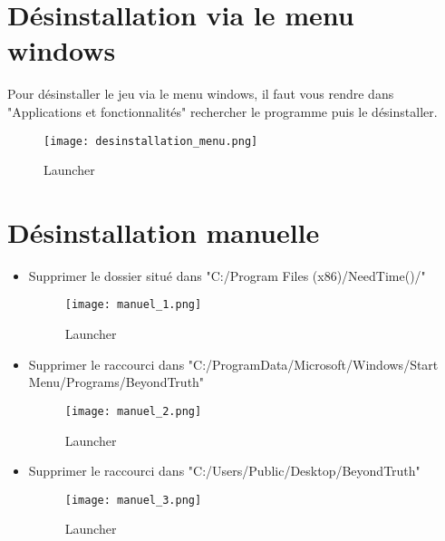 \documentclass[
	article,			%
	11pt,				%
	oneside,			%
	a4paper,			%
	chapter=TITLE,
	french,			%
	sumario=tradicional
	]{base_nt}
\begin{document}
\section{Désinstallation via le menu windows}

Pour désinstaller le jeu via le menu windows, il faut vous rendre dans "Applications et fonctionnalités" rechercher le programme puis le désinstaller.

\vspace{0cm}
\begin{figure}[ht]
	\caption{Launcher}
	\centering
	\texttt{[image: desinstallation\_menu.png]}
	
\end{figure}

\newpage

\section{Désinstallation manuelle}

\begin{itemize}
    \item Supprimer le dossier situé dans "C:/Program Files (x86)/NeedTime()/"
    \vspace{0cm}
    \begin{figure}[ht]
    	\caption{Launcher}
    	\centering
    	\texttt{[image: manuel\_1.png]}
    	
    \end{figure}
    \newpage
    \item Supprimer le raccourci dans "C:/ProgramData/Microsoft/Windows/Start Menu/Programs/BeyondTruth"
    \vspace{0cm}
    \begin{figure}[ht]
    	\caption{Launcher}
    	\centering
    	\texttt{[image: manuel\_2.png]}
    	
    \end{figure}
    \newpage
    \item Supprimer le raccourci dans "C:/Users/Public/Desktop/BeyondTruth"
    \vspace{0cm}
    \begin{figure}[ht]
    	\caption{Launcher}
    	\centering
    	\texttt{[image: manuel\_3.png]}
    	
    \end{figure}
\end{itemize}
\end{document}
